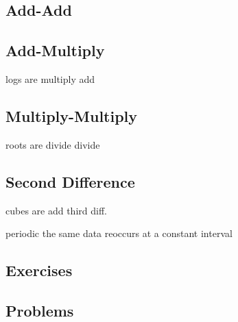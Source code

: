 \subsection{Add-Add}
\subsection{Add-Multiply}
logs are multiply add
\subsection{Multiply-Multiply}
roots are divide divide
\subsection{Second Difference}
cubes are add third diff.

periodic the same data reoccurs at a constant interval
\newpage
\subsection{Exercises}

\newpage
{}
\subsection{Problems}
\noindent{}
\newpage
